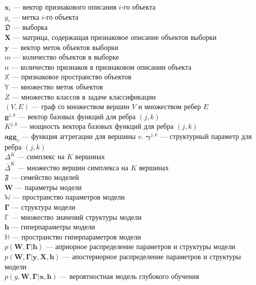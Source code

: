 \noindent$\mathbf{x}_i$ --- вектор признакового описания $i$-го объекта\\
$y_i$ --- метка $i$-го объекта\\
$\mathfrak{D}$ --- выборка\\
$\mathbf{X}$ --- матрица, содержащая признаковое описание объектов выборки\\
$\mathbf{y}$ --- вектор меток объектов выборки\\
$m$ --- количество объектов в выборке\\
$n$ --- количество признаков в признаковом описании объекта\\
$\mathbb{X}$ --- признаковое пространство объектов\\
$\mathbb{Y}$ --- множество меток объектов\\
$Z$ --- множество классов в задаче классификации\\
$(V,E)$ --- граф со множеством вершин $V$ и множеством ребер $E$\\
$\mathbf{g}^{j,k}$ --- вектор базовых функций для ребра $(j,k)$\\
$K^{j,k}$ --- мощность вектора базовых функций для ребра $(j,k)$\\
$\textbf{agg}_v$ --- функция аггрегации для вершины $v$. 
$\boldsymbol{\gamma}^{j,k}$ --- структурный параметр для ребра $(j,k)$\\
$\Delta^{K}$ --- симплекс на $K$ вершинах\\
$\bar{\Delta}^{K}$ --- множество вершин симплекса на $K$ вершинах\\
$\mathfrak{F}$ --- семейство моделей\\
$\mathbf{W}$ --- параметры модели\\
$\mathbb{W}$ --- пространство параметров модели\\
$\boldsymbol{\Gamma}$ --- структура модели\\
$\mathbb{\Gamma}$ --- множество значений структуры модели\\
$\mathbf{h}$ --- гиперпараметры модели\\
$\mathbb{H}$ --- пространство гиперпараметров модели\\
$p(\mathbf{W}, \boldsymbol{\Gamma}|\mathbf{h})$ --- априорное распределение параметров и структуры модели\\
$p(\mathbf{W}, \boldsymbol{\Gamma}|\mathbf{y}, \mathbf{X}, \mathbf{h})$ --- апостериорное распределение параметров и структуры модели\\
$p({y}, \mathbf{W},  \boldsymbol{\Gamma}|\mathbf{x}, \mathbf{h})$ --- вероятностная модель глубокого обучения\\
